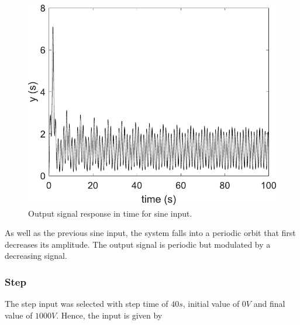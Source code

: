     \begin{figure}[H]
        \centering
        \includegraphics[scale=0.4]{figs/OutSine5fInput.pdf}
        \caption{Output signal response in time for sine input.}
        \label{fig:OutSin5f}
    \end{figure}
    
    As well as the previous sine input, the system falls into a periodic orbit that first decreases its amplitude. The output signal is periodic but modulated by a decreasing signal.
    
    \subsubsection{Step}\label{subsubsec:step}
    The step input was selected with step time of $40s$, initial value of $0V$ and final value of $1000V$. Hence, the input is given by
    
